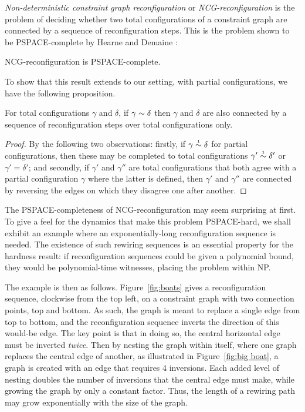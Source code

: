\documentclass{lmcs}
\let\capsabbrev=\uppercase
\begin{document}
\emph{Non-deterministic constraint graph reconfiguration} or \emph{\capsabbrev{ncg}-reconfiguration} is the problem of deciding whether two total configurations of a constraint graph are connected by a sequence of reconfiguration steps. This is the problem shown to be PSPACE-complete by Hearne and Demaine \cite{GamesPuzzlesAndComputation}:

\begin{theorem}
\capsabbrev{ncg}-reconfiguration is \capsabbrev{pspace}-complete.
\end{theorem}

To show that this result extends to our setting, with partial configurations, we have the following proposition.

\begin{proposition}
\label{prop:partial simulates total reconfiguration}
For total configurations $\gamma$ and $\delta$, if $\gamma\perm\delta$ then $\gamma$ and $\delta$ are also connected by a sequence of reconfiguration steps over total configurations only.
\end{proposition}

\begin{proof}
By the following two observations: firstly, 
%
if $\gamma\perm*\delta$ for partial configurations, then these may be completed to total configurations $\gamma'\perm*\delta'$ or $\gamma'=\delta'$; and secondly,
%
if $\gamma'$ and $\gamma''$ are total configurations that both agree with a partial configuration $\gamma$ where the latter is defined, then $\gamma'$ and $\gamma''$ are connected by reversing the edges on which they disagree one after another.
%
\end{proof}

The PSPACE-completeness of NCG-reconfiguration may seem surprising at first. To give a feel for the dynamics that make this problem \capsabbrev{pspace}-hard, we shall exhibit an example where an exponentially-long reconfiguration sequence is needed. The existence of such rewiring sequences is an essential property for the hardness result: if reconfiguration sequences could be given a polynomial bound, they would be polynomial-time witnesses, placing the problem within NP.

The example is then as follows. Figure~\ref{fig:boats} gives a reconfiguration sequence, clockwise from the top left, on a constraint graph with two connection points, top and bottom. As such, the graph is meant to replace a single edge from top to bottom, and the reconfiguration sequence inverts the direction of this would-be edge. The key point is that in doing so, the central horizontal edge must be inverted \emph{twice}. Then by nesting the graph within itself, where one graph replaces the central edge of another, as illustrated in Figure~\ref{fig:big boat}, a graph is created with an edge that requires 4 inversions. Each added level of nesting doubles the number of inversions that the central edge must make, while growing the graph by only a constant factor. Thus, the length of a rewiring path may grow exponentially with the size of the graph.
\end{document}
